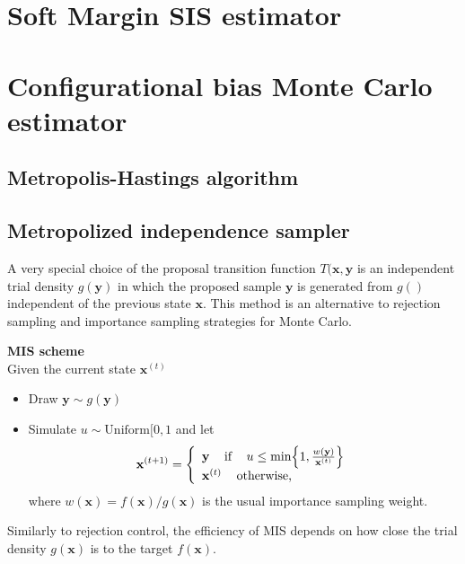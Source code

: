 \documentclass[times, utf8, diplomski]{fer}
\begin{document}
\section{Soft Margin SIS estimator}

\section{Configurational bias Monte Carlo estimator}
\subsection{Metropolis-Hastings algorithm}

\subsection{Metropolized independence sampler}
A very special choice of the proposal transition function $T(\mathbf{x}, \mathbf{y}$ is an independent trial density $g(\mathbf{y})$ in which the proposed sample $\mathbf{y}$ is generated from $g()$ independent of the previous state $\mathbf{x}$. This method is an alternative to rejection sampling and importance sampling strategies for Monte Carlo.

\vspace{3mm}
\textbf{MIS scheme}\\
Given the current state $\mathbf{x}^{(t)}$
\begin{itemize}
\item{
Draw $\mathbf{y} \sim g(\mathbf{y})$}
\item{
Simulate $u \sim \text{Uniform}[0, 1$ and let 
\[\mathbf{x}^{(t + 1)} = \left\{
  \begin{array}{lr}
    \mathbf{y} \text{\hspace{3mm} if \hspace{3mm}} u \leq \text{min}\Big \{1,
    \frac{w(\mathbf{y})}{\mathbf{x}^{(t)}} \Big \}  \\
    \mathbf{x}^{(t)} \text{\hspace{3mm} otherwise,}
  \end{array}
\right.
\]
where $w(\mathbf{x}) = f(\mathbf{x}) / g(\mathbf{x})$ is the usual importance sampling weight. }
\end{itemize}
\vspace{3mm}

Similarly to rejection control, the efficiency of MIS depends on how close the trial density $g(\mathbf{x})$ is to the target $f(\mathbf{x})$. 
\end{document}

